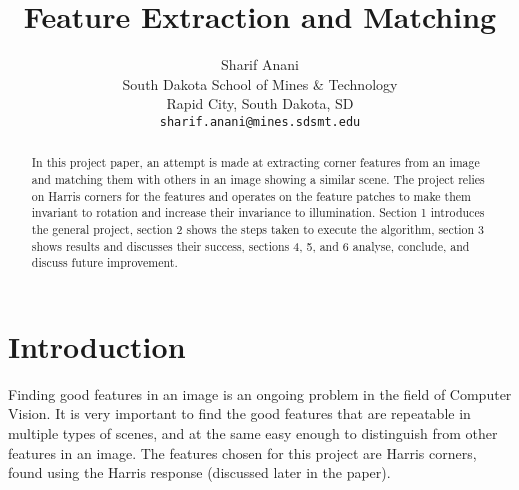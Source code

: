 \documentclass[10pt,twocolumn,letterpaper]{article}
\begin{document}
\title{Feature Extraction and Matching}

\author{Sharif Anani\\
South Dakota School of Mines \& Technology\\
Rapid City, South Dakota, SD\\
{\tt\small sharif.anani@mines.sdsmt.edu}}

\maketitle

\begin{abstract}
   In this project paper, an attempt is made at extracting corner features from an image and matching them with others in an image showing a similar scene. The project relies on Harris corners for the features and operates on the feature patches to make them invariant to rotation and increase their invariance to illumination. Section 1 introduces the general project, section 2 shows the steps taken to execute the algorithm, section 3 shows results and discusses their success, sections 4, 5, and 6 analyse, conclude, and discuss future improvement.
\end{abstract}

\section{Introduction}

Finding good features in an image is an ongoing problem in the field of Computer Vision. It is very important to find the good features that are repeatable in multiple types of scenes, and at the same easy enough to distinguish from other features in an image. The features chosen for this project are Harris corners, found using the Harris response (discussed later in the paper).\\
\end{document}
